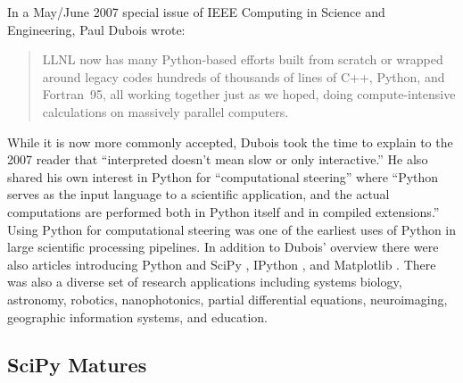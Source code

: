 \documentclass[fleqn,10pt]{wlscirep}
\begin{document}

In a May/June 2007 special issue of IEEE Computing in Science and
Engineering, Paul Dubois wrote\cite{dubois2007guest}:
\begin{quote}
LLNL now has many Python-based efforts built from scratch or wrapped around
legacy codes \textelp{} hundreds of thousands
of lines of C++, Python, and Fortran~95, all working together just as we hoped,
doing compute-intensive calculations on massively parallel computers.
\end{quote}
While it is now more commonly accepted, Dubois took the time to explain to
the 2007 reader that ``interpreted doesn't mean slow or only interactive.''
He also shared his own interest in Python for ``computational steering''
where ``Python serves as the input language to a scientific application, and the actual
computations are performed both in Python itself and in compiled extensions.''
Using Python for computational steering was one of the earliest uses of Python
in large scientific processing pipelines.
In addition to Dubois' overview there were also articles introducing
Python and SciPy \cite{oliphant2007python}, IPython \cite{perez2007ipython},
and  Matplotlib \cite{hunter2007matplotlib}.
There was also a diverse set of
research applications including
systems biology\cite{myers2007python},
astronomy\cite{greenfield2007reaching},
robotics\cite{krauss2007python},
nanophotonics\cite{bienstman2007python},
partial differential equations\cite{mardal2007using},
neuroimaging\cite{millman2007analysis},
geographic information systems\cite{shi2007python}, and
education\cite{backer2007computational, myers2007pythona}.


\subsection*{SciPy Matures}
\end{document}
